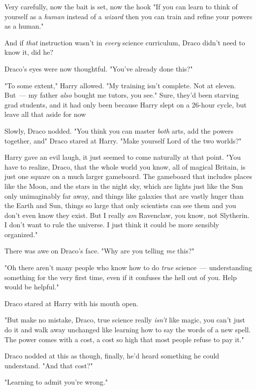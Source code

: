 Very carefully, now{\el} the bait is set, now the hook{\el} "If you can
learn to think of yourself as a \emph{human} instead of a \emph{wizard} then
you can train and refine your powers as a human."

And if \emph{that} instruction wasn't in \emph{every} science curriculum, Draco
didn't need to know it, did he?

Draco's eyes were now thoughtful. "You've{\el} already done this?"

"To some extent," Harry allowed. "My training isn't complete. Not at eleven.
But~--- my father \emph{also} bought me tutors, you see." Sure, they'd been
starving grad students, and it had only been because Harry slept on a 26-hour
cycle, but leave all that aside for now{\el}

Slowly, Draco nodded. "You think you can master \emph{both} arts, add the
powers together, and{\el}" Draco stared at Harry. "Make yourself Lord of the
two worlds?"

Harry gave an evil laugh, it just seemed to come naturally at that point. "You
have to realize, Draco, that the whole world you know, all of magical Britain,
is just one square on a much larger gameboard. The gameboard that includes
places like the Moon, and the stars in the night sky, which are lights just
like the Sun only unimaginably far away, and things like galaxies that are
vastly huger than the Earth and Sun, things so large that only scientists can
see them and you don't even know they exist. But I really \emph{am} Ravenclaw,
you know, not Slytherin. I don't want to rule the universe. I just think it
could be more sensibly organized."

There was awe on Draco's face. "Why are you telling \emph{me} this?"

"Oh{\el} there aren't many people who know how to do \emph{true}
science~--- understanding something for the very first time, even if it confuses
the hell out of you. Help would be helpful."

Draco stared at Harry with his mouth open.

"But make no mistake, Draco, true science really \emph{isn't} like magic, you
can't just do it and walk away unchanged like learning how to say the words of
a new spell. The power comes with a cost, a cost so high that most people
refuse to pay it."

Draco nodded at this as though, finally, he'd heard something he could
understand. "And that cost?"

"Learning to admit you're wrong."

